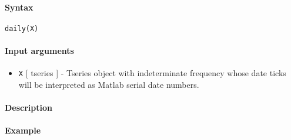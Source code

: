 


	\paragraph{Syntax}\label{syntax}

\begin{verbatim}
daily(X)
\end{verbatim}

\paragraph{Input arguments}\label{input-arguments}

\begin{itemize}
\itemsep1pt\parskip0pt
\item
  \texttt{X} {[} tseries {]} - Tseries object with indeterminate
  frequency whose date ticks will be interpreted as Matlab serial date
  numbers.
\end{itemize}

\paragraph{Description}\label{description}

\paragraph{Example}\label{example}



